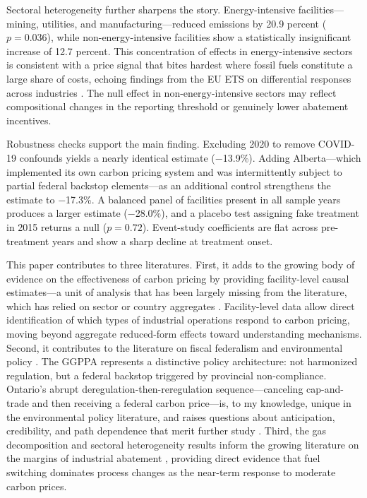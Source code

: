 \documentclass[12pt]{article}
\begin{document}
Sectoral heterogeneity further sharpens the story. Energy-intensive facilities---mining, utilities, and manufacturing---reduced emissions by 20.9 percent ($p = 0.036$), while non-energy-intensive facilities show a statistically insignificant increase of 12.7 percent. This concentration of effects in energy-intensive sectors is consistent with a price signal that bites hardest where fossil fuels constitute a large share of costs, echoing findings from the EU ETS on differential responses across industries \citep{Fowlie2012, Colmer2024}. The null effect in non-energy-intensive sectors may reflect compositional changes in the reporting threshold or genuinely lower abatement incentives.

Robustness checks support the main finding. Excluding 2020 to remove COVID-19 confounds yields a nearly identical estimate ($-$13.9\%). Adding Alberta---which implemented its own carbon pricing system and was intermittently subject to partial federal backstop elements---as an additional control strengthens the estimate to $-$17.3\%. A balanced panel of facilities present in all sample years produces a larger estimate ($-$28.0\%), and a placebo test assigning fake treatment in 2015 returns a null ($p = 0.72$). Event-study coefficients are flat across pre-treatment years and show a sharp decline at treatment onset.

This paper contributes to three literatures. First, it adds to the growing body of evidence on the effectiveness of carbon pricing by providing facility-level causal estimates---a unit of analysis that has been largely missing from the literature, which has relied on sector or country aggregates \citep{Metcalf2020, Best2020, Green2021}. Facility-level data allow direct identification of which types of industrial operations respond to carbon pricing, moving beyond aggregate reduced-form effects toward understanding mechanisms. Second, it contributes to the literature on fiscal federalism and environmental policy \citep{Oates1972, Levinson2003, Fell2017}. The GGPPA represents a distinctive policy architecture: not harmonized regulation, but a federal backstop triggered by provincial non-compliance. Ontario's abrupt deregulation-then-reregulation sequence---canceling cap-and-trade and then receiving a federal carbon price---is, to my knowledge, unique in the environmental policy literature, and raises questions about anticipation, credibility, and path dependence that merit further study \citep{Anderson2011, Salant2016}. Third, the gas decomposition and sectoral heterogeneity results inform the growing literature on the margins of industrial abatement \citep{Fowlie2012, Shapiro2024}, providing direct evidence that fuel switching dominates process changes as the near-term response to moderate carbon prices.
\end{document}
